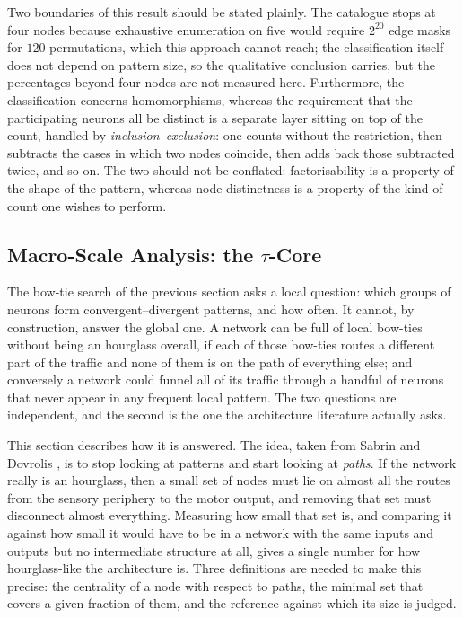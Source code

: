 \documentclass[12pt,a4paper,oneside]{article}
\theoremstyle{definition}
\theoremstyle{plain}
\begin{document}
Two boundaries of this result should be stated plainly. The catalogue stops
at four nodes because exhaustive enumeration on five would require $2^{20}$
edge masks for $120$ permutations, which this approach cannot reach; the
classification itself does not depend on pattern size, so the qualitative
conclusion carries, but the percentages beyond four nodes are not measured
here. Furthermore, the classification concerns homomorphisms, whereas the
requirement that the participating neurons all be distinct is a separate
layer sitting on top of the count, handled by \emph{inclusion--exclusion}:
one counts without the restriction, then subtracts the cases in which two
nodes coincide, then adds back those subtracted twice, and so on. The two should
not be conflated: factorisability is a property of the shape of the pattern,
whereas node distinctness is a property of the kind of count one wishes to
perform.

\subsection{Macro-Scale Analysis: the \texorpdfstring{$\tau$}{tau}-Core}
\label{sec:macro-methods}

The bow-tie search of the previous section asks a local question: which
groups of neurons form convergent--divergent patterns, and how often. It
cannot, by construction, answer the global one. A network can be full of
local bow-ties without being an hourglass overall, if each of those bow-ties
routes a different part of the traffic and none of them is on the path of
everything else; and conversely a network could funnel all of its traffic
through a handful of neurons that never appear in any frequent local
pattern. The two questions are independent, and the second is the one the
architecture literature actually asks.

This section describes how it is answered. The idea, taken from Sabrin and
Dovrolis \cite{sabrin2020}, is to stop looking at patterns and start looking
at \emph{paths}. If the network really is an hourglass, then a small set of
nodes must lie on almost all the routes from the sensory periphery to the
motor output, and removing that set must disconnect almost everything.
Measuring how small that set is, and comparing it against how small it would
have to be in a network with the same inputs and outputs but no intermediate
structure at all, gives a single number for how hourglass-like the
architecture is. Three definitions are needed to make this precise: the
centrality of a node with respect to paths, the minimal set that covers a
given fraction of them, and the reference against which its size is judged.
\end{document}
